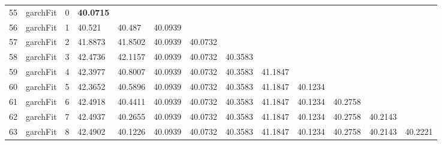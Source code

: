 \documentclass[10pt,a4paper]{article}
\begin{document}
\begin{table}[ht]
\begin{tabular}{rlrllllllllll}
   \hline
55 & garchFit &     0 & \textbf{40.0715} &  &  &  &  &  &  &  &  &  \\ 
  56 & garchFit &     1 & 40.521 & 40.487 & 40.0939 &  &  &  &  &  &  &  \\ 
  57 & garchFit &     2 & 41.8873 & 41.8502 & 40.0939 & 40.0732 &  &  &  &  &  &  \\ 
  58 & garchFit &     3 & 42.4736 & 42.1157 & 40.0939 & 40.0732 & 40.3583 &  &  &  &  &  \\ 
  59 & garchFit &     4 & 42.3977 & 40.8007 & 40.0939 & 40.0732 & 40.3583 & 41.1847 &  &  &  &  \\ 
  60 & garchFit &     5 & 42.3652 & 40.5896 & 40.0939 & 40.0732 & 40.3583 & 41.1847 & 40.1234 &  &  &  \\ 
  61 & garchFit &     6 & 42.4918 & 40.4411 & 40.0939 & 40.0732 & 40.3583 & 41.1847 & 40.1234 & 40.2758 &  &  \\ 
  62 & garchFit &     7 & 42.4937 & 40.2655 & 40.0939 & 40.0732 & 40.3583 & 41.1847 & 40.1234 & 40.2758 & 40.2143 &  \\ 
  63 & garchFit &     8 & 42.4902 & 40.1226 & 40.0939 & 40.0732 & 40.3583 & 41.1847 & 40.1234 & 40.2758 & 40.2143 & 40.2221 \\ 
   \hline
\end{tabular}
\end{table}
\end{document}
